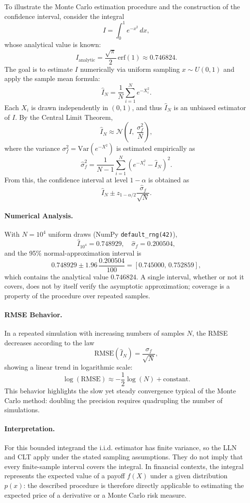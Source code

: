 To illustrate the Monte Carlo estimation procedure and the construction of the confidence interval, consider the integral
\[
I = \int_0^1 e^{-x^2}\,dx,
\]
whose analytical value is known:
\[
I_{\text{analytic}} = \frac{\sqrt{\pi}}{2}\,\mathrm{erf}(1) \approx 0.746824.
\]
The goal is to estimate $I$ numerically via uniform sampling $x \sim U(0,1)$ and apply the sample mean formula:
\[
\hat{I}_N = \frac{1}{N}\sum_{i=1}^N e^{-X_i^2}.
\]
Each $X_i$ is drawn independently in $(0,1)$, and thus $\hat{I}_N$ is an unbiased estimator of $I$.  
By the Central Limit Theorem,
\[
\hat{I}_N \approx \mathcal{N}\!\left(I,\ \frac{\sigma_f^2}{N}\right),
\]
where the variance $\sigma_f^2 = \mathrm{Var}(e^{-X^2})$ is estimated empirically as
\[
\hat{\sigma}_f^2 = \frac{1}{N-1}\sum_{i=1}^N \left(e^{-X_i^2} - \hat{I}_N\right)^2.
\]
From this, the confidence interval at level $1-\alpha$ is obtained as
\[
\hat I_N\pm z_{1-\alpha/2}\frac{\hat\sigma_f}{\sqrt N}.
\]

\paragraph{Numerical Analysis.}
With $N=10^4$ uniform draws (NumPy \texttt{default\_rng(42)}),
\[
\hat{I}_{10^4} = 0.748929,\quad \hat{\sigma}_f = 0.200504,
\]
and the 95\% normal-approximation interval is
\[
0.748929\pm1.96\,\frac{0.200504}{100}
=[0.745000,\,0.752859],
\]
which contains the analytical value $0.746824$. A single interval,
whether or not it covers, does not by itself verify the asymptotic
approximation; coverage is a property of the procedure over repeated samples.

\paragraph{RMSE Behavior.}
In a repeated simulation with increasing numbers of samples $N$, the RMSE decreases according to the law
\[
\mathrm{RMSE}(\hat{I}_N) = \frac{\sigma_f}{\sqrt{N}},
\]
showing a linear trend in logarithmic scale:
\[
\log(\mathrm{RMSE}) \approx -\frac{1}{2}\log(N) + \text{constant}.
\]
This behavior highlights the slow yet steady convergence typical of the Monte Carlo method: doubling the precision requires quadrupling the number of simulations.



\paragraph{Interpretation.}
For this bounded integrand the i.i.d. estimator has finite variance,
so the LLN and CLT apply under the stated sampling assumptions. They
do not imply that every finite-sample interval covers the integral.
In financial contexts, the integral represents the expected value of a payoff $f(X)$ under a given distribution $p(x)$: the described procedure is therefore directly applicable to estimating the expected price of a derivative or a Monte Carlo risk measure.
